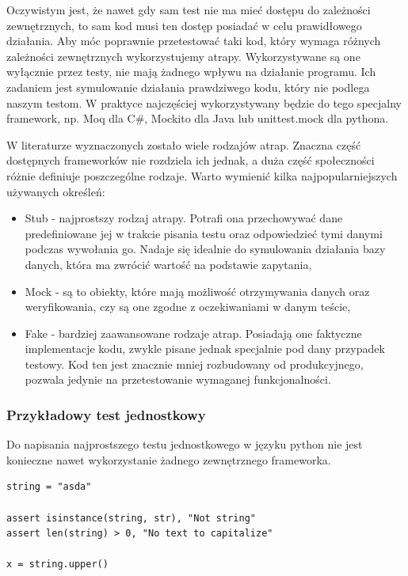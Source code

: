Oczywistym jest, że nawet gdy sam test nie ma mieć dostępu do zależności zewnętrznych, to sam kod musi ten dostęp posiadać w celu prawidłowego działania. Aby móc poprawnie przetestować taki kod, który wymaga różnych zależności zewnętrznych wykorzystujemy atrapy. Wykorzystywane są one wyłącznie przez testy, nie mają żadnego wpływu na działanie programu. Ich zadaniem jest symulowanie działania prawdziwego kodu, który nie podlega naszym testom. W praktyce najczęściej wykorzystywany będzie do tego specjalny framework, np. Moq dla C\#, Mockito dla Java lub unittest.mock dla pythona. 

W literaturze wyznaczonych zostało wiele rodzajów atrap. Znaczna część dostępnych frameworków nie rozdziela ich jednak, a duża część społeczności różnie definiuje poszczególne rodzaje. Warto wymienić kilka najpopularniejszych używanych określeń: 
\begin{itemize}
    \item Stub - najprostszy rodzaj atrapy. Potrafi ona przechowywać dane predefiniowane jej w trakcie pisania testu oraz odpowiedzieć tymi danymi podczas wywołania go. Nadaje się idealnie do symulowania działania bazy danych, która ma zwrócić wartość na podstawie zapytania,
    \item Mock - są to obiekty, które mają możliwość otrzymywania danych oraz weryfikowania, czy są one zgodne z oczekiwaniami w danym teście,
    \item Fake - bardziej zaawansowane rodzaje atrap. Posiadają one faktyczne implementacje kodu, zwykle pisane jednak specjalnie pod dany przypadek testowy. Kod ten jest znacznie mniej rozbudowany od produkcyjnego, pozwala jedynie na przetestowanie wymaganej funkcjonalności. 
\end{itemize}

\subsubsection{Przykładowy test jednostkowy}
Do napisania najprostszego testu jednostkowego w języku python nie jest konieczne nawet wykorzystanie żadnego zewnętrznego frameworka. 

\begin{lstlisting}[caption={Test jednostkowy w języku Python}]
string = "asda"

assert isinstance(string, str), "Not string"
assert len(string) > 0, "No text to capitalize"

x = string.upper()
\end{lstlisting}

